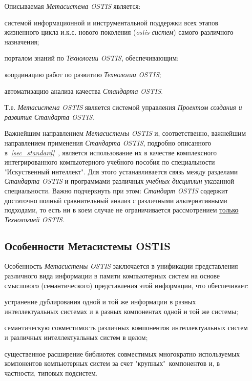 Описываемая \textit{Метасистема OSTIS} является:

\begin{textitemize}
	\item системой информационной и инструментальной поддержки всех этапов жизненного цикла и.к.с. нового поколения (\textit{ostis-систем}) самого различного назначения;
	\item порталом знаний по \textit{Технологии OSTIS}, обеспечивающим:
		\begin{textitemize}
			\item координацию работ по развитию \textit{Технологии OSTIS};
			\item автоматизацию анализа качества \textit{Стандарта OSTIS}.
		\end{textitemize}
	Т.е. \textit{Метасистема OSTIS} является системой управления \textit{Проектом создания и развития Стандарта OSTIS}.	
\end{textitemize}

Важнейшим направлением \textit{Метасистемы OSTIS} и, соответственно, важнейшим направлением применения \textit{Стандарта OSTIS}, подробно описанного в~\textit{\ref{sec_standard}~}, является использование их в качестве комплексного интегрированного компьютерного учебного пособия по специальности "Искуственный интеллект"{}. Для этого устанавливается связь между разделами \textit{Стандарта OSTIS} и программами различных \textit{учебных дисциплин} указанной специальности. Важно подчеркнуть при этом: \textit{Стандарт OSTIS} содержит достаточно полный сравнительный анализ с различными альтернативными подходами, то есть ни в коем случае не ограничивается рассмотрением \uline{только} \textit{Технологией OSTIS}.

\subsection{Особенности Метасистемы OSTIS}

Особенность \textit{Метасистемы OSTIS} заключается в унификации представления различного вида информации в памяти компьютерных систем на основе смыслового (семантического) представления этой информации, что обеспечивает:
	\begin{textitemize}
		\item устранение дублирования одной и той же информации в разных интеллектуальных системах и в разных компонентах одной и той же системы;
		\item семантическую совместимость различных компонентов интеллектуальных систем и различных интеллектуальных систем в целом;
		\item существенное расширение библиотек совместимых многократно используемых компонентов компьютерных систем за счет "крупных"\ компонентов и, в частности, типовых подсистем.
	\end{textitemize}

